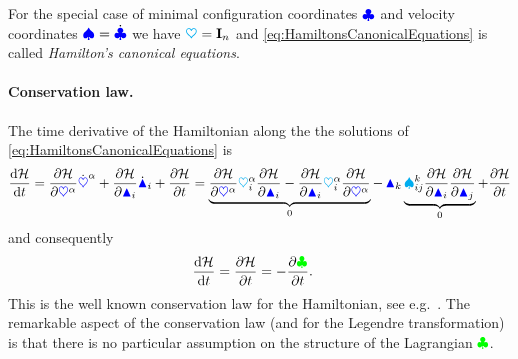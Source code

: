 For the special case of minimal configuration coordinates $\genCoord$ and velocity coordinates $\sysVel = \genCoordd$ we have $\kinMat = \idMat[\dimConfigSpace]$ and \eqref{eq:HamiltonsCanonicalEquations} is called \textit{Hamilton's canonical equations}.

\paragraph{Conservation law.}
The time derivative of the Hamiltonian along the the solutions of \eqref{eq:HamiltonsCanonicalEquations} is
\begin{align}\label{eq:BalanceHamiltonian}
 \diff[\Hamiltonian]{t} = \pdiff[\Hamiltonian]{\sysCoordCoeff{\GidxI}} \sysCoordCoeffd{\GidxI} + \pdiff[\Hamiltonian]{\genMomentumCoeff{\LidxI}} \genMomentumCoeffd{\LidxI} + \pdiff[\Hamiltonian]{t}
 = \underbrace{\pdiff[\Hamiltonian]{\sysCoordCoeff{\GidxI}} \kinMatCoeff{\GidxI}{\LidxI} \pdiff[\Hamiltonian]{\genMomentumCoeff{\LidxI}}
 - \pdiff[\Hamiltonian]{\genMomentumCoeff{\LidxI}} \kinMatCoeff{\GidxI}{\LidxI} \pdiff[\Hamiltonian]{\sysCoordCoeff{\GidxI}}}_{0}
 - \,\genMomentumCoeff{\LidxIII} \underbrace{\BoltzSym{\LidxIII}{\LidxI}{\LidxII} \pdiff[\Hamiltonian]{\genMomentumCoeff{\LidxI}} \pdiff[\Hamiltonian]{\genMomentumCoeff{\LidxII}}}_{0}
 + \pdiff[\Hamiltonian]{t}
\end{align}
and consequently
\begin{align}
 \diff[\Hamiltonian]{t} &= \pdiff[\Hamiltonian]{t} = -\pdiff[\Lagrangian]{t}.
\end{align}
This is the well known conservation law for the Hamiltonian, see e.g.\ \cite[ch.\,VI.6]{Lanczos:Variational}.
The remarkable aspect of the conservation law (and for the Legendre transformation) is that there is no particular assumption on the structure of the Lagrangian $\Lagrangian$.


